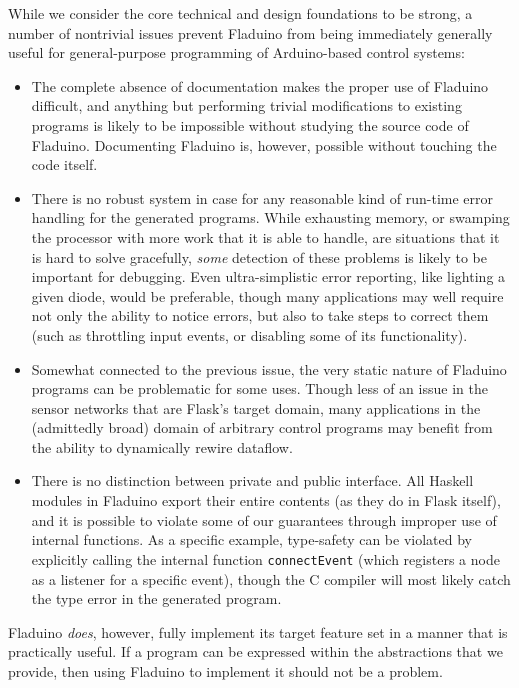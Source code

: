 \documentclass[a4paper, oneside, final]{memoir}
\begin{document}
While we consider the core technical and design foundations to be
strong, a number of nontrivial issues prevent Fladuino from being
immediately generally useful for general-purpose programming of
Arduino-based control systems:

\begin{itemize}
\item The complete absence of documentation makes the proper use of
  Fladuino difficult, and anything but performing trivial
  modifications to existing programs is likely to be impossible
  without studying the source code of Fladuino.  Documenting Fladuino
  is, however, possible without touching the code itself.
\item There is no robust system in case for any reasonable kind of
  run-time error handling for the generated programs.  While
  exhausting memory, or swamping the processor with more work that it
  is able to handle, are situations that it is hard to solve
  gracefully, \textit{some} detection of these problems is likely to
  be important for debugging.  Even ultra-simplistic error reporting,
  like lighting a given diode, would be preferable, though many
  applications may well require not only the ability to notice errors,
  but also to take steps to correct them (such as throttling input
  events, or disabling some of its functionality).
\item Somewhat connected to the previous issue, the very static nature
  of Fladuino programs can be problematic for some uses.  Though less
  of an issue in the sensor networks that are Flask's target domain,
  many applications in the (admittedly broad) domain of arbitrary
  control programs may benefit from the ability to dynamically rewire
  dataflow.
\item There is no distinction between private and public interface.
  All Haskell modules in Fladuino export their entire contents (as
  they do in Flask itself), and it is possible to violate some of our
  guarantees through improper use of internal functions.  As a
  specific example, type-safety can be violated by explicitly calling
  the internal function \texttt{connectEvent} (which registers a node
  as a listener for a specific event), though the C compiler will most
  likely catch the type error in the generated program.
\end{itemize}

Fladuino \textit{does}, however, fully implement its target feature
set in a manner that is practically useful.  If a program can be
expressed within the abstractions that we provide, then using Fladuino
to implement it should not be a problem.
\end{document}
